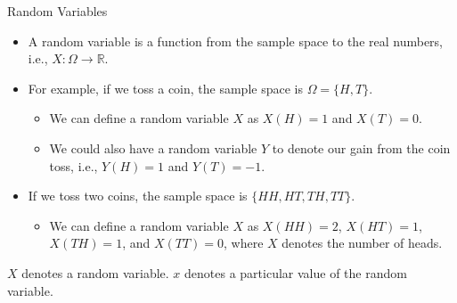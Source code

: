 \documentclass[handout]{beamer}
\begin{document}
\begin{frame}{Random Variables}
    \begin{itemize}
        \item A random variable is a function from the sample space to the real numbers, i.e., $X: \Omega \rightarrow \mathbb{R}$.
        \item For example, if we toss a coin, the sample space is  $\Omega = \{H, T\}$. 
        \begin{itemize}
            \item We can define a random variable $X$ as $X(H) = 1$ and $X(T) = 0$.
            \item We could also have a random variable $Y$ to denote our gain from the coin toss, i.e., $Y(H) = 1$ and $Y(T) = -1$.
        \end{itemize}
        \item If we toss two coins, the sample space is $\{HH, HT, TH, TT\}$. 
        \begin{itemize}
            \item We can define a random variable $X$ as $X(HH) = 2$, $X(HT) = 1$, $X(TH) = 1$, and $X(TT) = 0$, where $X$ denotes the number of heads.
        \end{itemize}
    \end{itemize}


    \begin{tcolorbox}[colback=metropolisblue!5,colframe=metropolisblue,title=Random Variables Notation]
        $X$ denotes a random variable. $x$ denotes a particular value of the random variable.
    \end{tcolorbox}
    
\end{frame}
\end{document}
